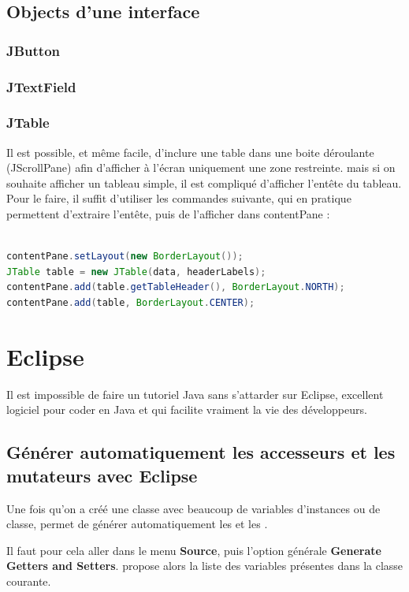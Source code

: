 \documentclass[a4paper,twoside]{article}
\begin{document}
\subsection{Objects d'une interface}
\subsubsection{JButton}

\subsubsection{JTextField}

\subsubsection{JTable}
Il est possible, et même facile, d'inclure une table dans une boite déroulante (JScrollPane) afin d'afficher à l'écran uniquement une zone restreinte. mais si on souhaite afficher un tableau simple, il est compliqué d'afficher l'entête du tableau. Pour le faire, il suffit d'utiliser les commandes suivante, qui en pratique permettent d'extraire l'entête, puis de l'afficher dans contentPane : 
\begin{lstlisting}[language=java]

contentPane.setLayout(new BorderLayout());
JTable table = new JTable(data, headerLabels);
contentPane.add(table.getTableHeader(), BorderLayout.NORTH);
contentPane.add(table, BorderLayout.CENTER);
\end{lstlisting}

\section{Eclipse}
Il est impossible de faire un tutoriel Java sans s'attarder sur Eclipse, excellent logiciel pour coder en Java et qui facilite vraiment la vie des développeurs.

\subsection{Générer automatiquement les accesseurs et les mutateurs avec Eclipse}
Une fois qu'on a créé une classe avec beaucoup de variables d'instances ou de classe,  permet de générer automatiquement les  et les . 

Il faut pour cela aller dans le menu \textbf{Source}, puis l'option générale \textbf{Generate Getters and Setters}.  propose alors la liste des variables présentes dans la classe courante.
\end{document}

